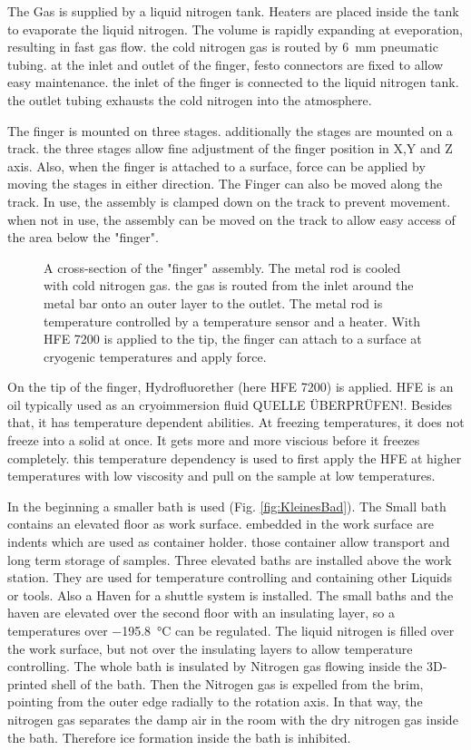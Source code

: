 The Gas is supplied by a liquid nitrogen tank. Heaters are placed inside the tank to evaporate the liquid nitrogen. The volume is rapidly expanding at eveporation, resulting in fast gas flow. the cold nitrogen gas is routed by \SI{6}{\milli\meter} pneumatic tubing. at the inlet and outlet of the finger, festo connectors are fixed to allow easy maintenance. the inlet of the finger is connected to the liquid nitrogen tank. the outlet tubing exhausts the cold nitrogen into the atmosphere.

The finger is  mounted on three stages. additionally the stages are mounted on a track. the three stages allow fine adjustment of the finger position in X,Y and Z axis. Also, when the finger is attached to a surface, force can be applied by moving the stages in either direction. The Finger can also be moved along the track. In use, the assembly is clamped down on the track to prevent movement. when not in use, the assembly can be moved on the track to allow easy access of the area below the "finger".

\begin{figure}[hbt!]
	\centering
	
	\caption{A cross-section of the "finger" assembly. The metal rod is cooled with cold nitrogen gas. the gas is routed from the inlet around the metal bar onto an outer layer to the outlet. The metal rod is temperature controlled by a temperature sensor and a heater. With HFE 7200 is applied to the tip, the finger can attach to a surface at cryogenic temperatures and apply force. }
	\label{fig:querschnittfinger}
\end{figure}

On the tip of the finger, Hydrofluorether (here HFE 7200) is applied. HFE is an oil typically used as an cryoimmersion fluid \cite{Faoro.2018b}QUELLE ÜBERPRÜFEN!. Besides that, it has temperature dependent abilities. At freezing temperatures, it does not freeze into a solid at once. It gets more and more viscious before it freezes completely. this temperature dependency is used to first apply the HFE at higher temperatures with low viscosity and pull on the sample at low temperatures.

In the beginning a smaller bath is used (Fig. \ref{fig:KleinesBad}). The Small bath contains an elevated floor as work surface. embedded in the work surface are indents which are used as container holder. those container allow transport and long term storage of samples. Three elevated baths are installed above the work station. They are used for temperature controlling and containing other Liquids or tools. Also a Haven for a shuttle system is installed. The small baths and the haven are elevated over the second floor with an insulating layer, so a temperatures over \SI{-195.8}{\degreeCelsius} can be regulated. The liquid nitrogen is filled over the work surface, but not over the insulating layers to allow temperature controlling. The whole bath is insulated by Nitrogen gas flowing inside the 3D-printed shell of the bath. Then the Nitrogen gas is expelled from the brim, pointing from the outer edge radially to the rotation axis. In that way, the nitrogen gas separates the damp air in the room with the dry nitrogen gas inside the bath. Therefore ice formation inside the bath is inhibited.

